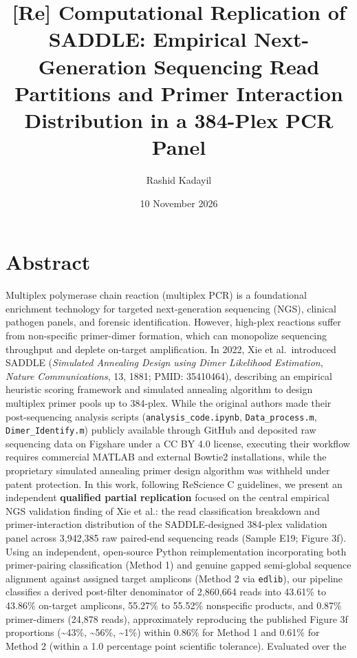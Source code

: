 \documentclass[
]{article}
\title{{[}Re{]} Computational Replication of SADDLE: Empirical
Next-Generation Sequencing Read Partitions and Primer Interaction
Distribution in a 384-Plex PCR Panel}
\author{Rashid Kadayil}
\date{10 November 2026}
\begin{document}
\maketitle

\section{Abstract}\label{abstract}

Multiplex polymerase chain reaction (multiplex PCR) is a foundational
enrichment technology for targeted next-generation sequencing (NGS),
clinical pathogen panels, and forensic identification. However,
high-plex reactions suffer from non-specific primer-dimer formation,
which can monopolize sequencing throughput and deplete on-target
amplification. In 2022, Xie et al.~introduced SADDLE (\emph{Simulated
Annealing Design using Dimer Likelihood Estimation}, \emph{Nature
Communications}, 13, 1881; PMID: 35410464), describing an empirical
heuristic scoring framework and simulated annealing algorithm to design
multiplex primer pools up to 384-plex. While the original authors made
their post-sequencing analysis scripts (\texttt{analysis\_code.ipynb},
\texttt{Data\_process.m}, \texttt{Dimer\_Identify.m}) publicly available
through GitHub and deposited raw sequencing data on Figshare under a CC
BY 4.0 license, executing their workflow requires commercial MATLAB and
external Bowtie2 installations, while the proprietary simulated
annealing primer design algorithm was withheld under patent protection.
In this work, following ReScience C guidelines, we present an
independent \textbf{qualified partial replication} focused on the
central empirical NGS validation finding of Xie et al.: the read
classification breakdown and primer-interaction distribution of the
SADDLE-designed 384-plex validation panel across 3,942,385 raw
paired-end sequencing reads (Sample E19; Figure 3f). Using an
independent, open-source Python reimplementation incorporating both
primer-pairing classification (Method 1) and genuine gapped semi-global
sequence alignment against assigned target amplicons (Method 2 via
\texttt{edlib}), our pipeline classifies a derived post-filter
denominator of 2,860,664 reads into 43.61\% to 43.86\% on-target
amplicons, 55.27\% to 55.52\% nonspecific products, and 0.87\%
primer-dimers (24,878 reads), approximately reproducing the published
Figure 3f proportions (\textasciitilde43\%, \textasciitilde56\%,
\textasciitilde1\%) within 0.86\% for Method 1 and 0.61\% for Method 2
(within a 1.0 percentage point scientific tolerance). Evaluated over the
\end{document}
